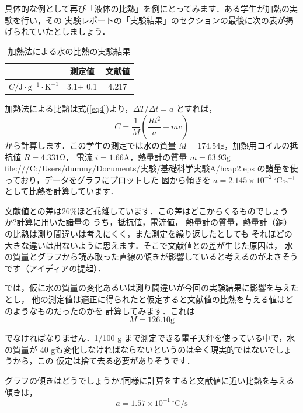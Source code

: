\documentclass[a4paper,10pt]{jarticle}
\def\rm#1{\mathrm{#1}}
\def\tempC{^\circ \rm{C}}
\begin{document}
 具体的な例として再び「液体の比熱」を例にとってみます．ある学生が加熱の実験を行い，その
 実験レポートの「実験結果」のセクションの最後に次の表が掲げられていたとしましょう．
%
\begin{table}[ht]
\begin{center}
\caption{加熱法による水の比熱の実験結果}
\label{tab3}
\begin{tabular}{ccc}\hline
 & 測定値 & 文献値 \\ \hline
$C/\rm{J \cdot g^{-1} \cdot K^{-1}} $ &  3.1$\pm$ 0.1 & 4.217 \\ \hline
\end{tabular}
\end{center}
\end{table}

加熱法による比熱は式(\ref{eq4})より，$\Delta T/\Delta t=a$ とすれば，
\[
C=\frac{1}{M}\left (\frac{Ri^2}{a}-mc\right )
\]
から計算します．この学生の測定では水の質量 $M=174.54 \rm{g}$，加熱用コイルの抵抗値 $R=4.331 \rm{\Omega}$，
電流 $i=1.66 \rm{A}$，熱量計の質量 $m=63.93 \rm{g}$file:///C:/Users/dummy/Documents/実験/基礎科学実験A/hcap2.eps
 の諸量を使っており，データをグラフにプロットした
図から傾きを $a=2.145\times 10^{-2}\, \tempC\rm{\cdot s^{-1}}$ として比熱を計算しています．

文献値との差は26\%ほど乖離しています．この差はどこからくるものでしょうか?計算に用いた諸量の
うち，抵抗値，電流値，
熱量計の質量，熱量計（銅）の比熱は測り間違いは考えにくく，また測定を繰り返したとしても
それほどの大きな違いは出ないように思えます．そこで文献値との差が生じた原因は，
水の質量とグラフから読み取った直線の傾きが影響していると考えるのがよさそうです（アイディアの提起）．

では，仮に水の質量の変化あるいは測り間違いが今回の実験結果に影響を与えたとし，
他の測定値は適正に得られたと仮定すると文献値の比熱を与える値はどのようなものだったのかを
計算してみます．これは
\[
M=126.10 \rm{g}
\]

\noindent
でなければなりません．1/100 g まで測定できる電子天秤を使っている中で，水の質量が
40 gも変化しなければならないというのは全く現実的ではないでしょうから，この
仮定は捨て去る必要がありそうです．

グラフの傾きはどうでしょうか?同様に計算をすると文献値に近い比熱を与える傾きは，
\[
a=1.57\times 10^{-1}\,\tempC  \rm{/s}
\]
\end{document}

